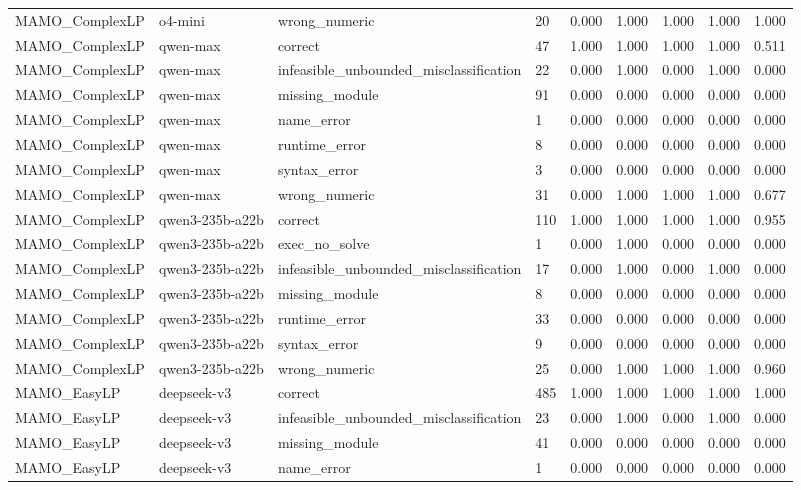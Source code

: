 \begin{table}[t]
\begin{tabular}{lllllllll}
MAMO\_ComplexLP & o4-mini & wrong\_numeric & 20 & 0.000 & 1.000 & 1.000 & 1.000 & 1.000 \\
MAMO\_ComplexLP & qwen-max & correct & 47 & 1.000 & 1.000 & 1.000 & 1.000 & 0.511 \\
MAMO\_ComplexLP & qwen-max & infeasible\_unbounded\_misclassification & 22 & 0.000 & 1.000 & 0.000 & 1.000 & 0.000 \\
MAMO\_ComplexLP & qwen-max & missing\_module & 91 & 0.000 & 0.000 & 0.000 & 0.000 & 0.000 \\
MAMO\_ComplexLP & qwen-max & name\_error & 1 & 0.000 & 0.000 & 0.000 & 0.000 & 0.000 \\
MAMO\_ComplexLP & qwen-max & runtime\_error & 8 & 0.000 & 0.000 & 0.000 & 0.000 & 0.000 \\
MAMO\_ComplexLP & qwen-max & syntax\_error & 3 & 0.000 & 0.000 & 0.000 & 0.000 & 0.000 \\
MAMO\_ComplexLP & qwen-max & wrong\_numeric & 31 & 0.000 & 1.000 & 1.000 & 1.000 & 0.677 \\
MAMO\_ComplexLP & qwen3-235b-a22b & correct & 110 & 1.000 & 1.000 & 1.000 & 1.000 & 0.955 \\
MAMO\_ComplexLP & qwen3-235b-a22b & exec\_no\_solve & 1 & 0.000 & 1.000 & 0.000 & 0.000 & 0.000 \\
MAMO\_ComplexLP & qwen3-235b-a22b & infeasible\_unbounded\_misclassification & 17 & 0.000 & 1.000 & 0.000 & 1.000 & 0.000 \\
MAMO\_ComplexLP & qwen3-235b-a22b & missing\_module & 8 & 0.000 & 0.000 & 0.000 & 0.000 & 0.000 \\
MAMO\_ComplexLP & qwen3-235b-a22b & runtime\_error & 33 & 0.000 & 0.000 & 0.000 & 0.000 & 0.000 \\
MAMO\_ComplexLP & qwen3-235b-a22b & syntax\_error & 9 & 0.000 & 0.000 & 0.000 & 0.000 & 0.000 \\
MAMO\_ComplexLP & qwen3-235b-a22b & wrong\_numeric & 25 & 0.000 & 1.000 & 1.000 & 1.000 & 0.960 \\
MAMO\_EasyLP & deepseek-v3 & correct & 485 & 1.000 & 1.000 & 1.000 & 1.000 & 1.000 \\
MAMO\_EasyLP & deepseek-v3 & infeasible\_unbounded\_misclassification & 23 & 0.000 & 1.000 & 0.000 & 1.000 & 0.000 \\
MAMO\_EasyLP & deepseek-v3 & missing\_module & 41 & 0.000 & 0.000 & 0.000 & 0.000 & 0.000 \\
MAMO\_EasyLP & deepseek-v3 & name\_error & 1 & 0.000 & 0.000 & 0.000 & 0.000 & 0.000 \\

\end{tabular}
\end{table}
